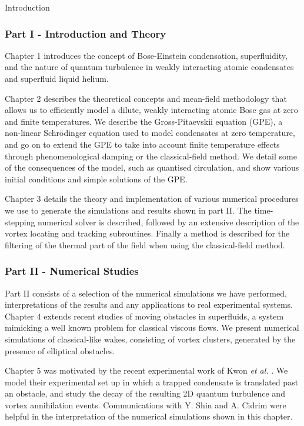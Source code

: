 \begin{chapter}{\label{cha:bose_gases}Introduction}
\subsubsection{Part I - Introduction and Theory}
Chapter 1 introduces the concept of Bose-Einstein condensation, superfluidity, and the nature of quantum turbulence in weakly interacting atomic condensates and superfluid liquid helium.

Chapter 2 describes the theoretical concepts and mean-field methodology that allows us to efficiently model a dilute, weakly interacting atomic Bose gas at zero and finite temperatures. We describe the Gross-Pitaevskii equation (GPE), a non-linear Schr\"odinger equation used to model condensates at zero temperature, and go on to extend the GPE to take into account finite temperature effects through phenomenological damping or the classical-field method. We detail some of the consequences of the model, such as quantised circulation, and show various initial conditions and simple solutions of the GPE.

Chapter 3 details the theory and implementation of various numerical procedures we use to generate the simulations and results shown in part II. The time-stepping numerical solver is described, followed by an extensive description of the vortex locating and tracking subroutines. Finally a method is described for the filtering of the thermal part of the field when using the classical-field method.

\subsubsection{Part II - Numerical Studies}
Part II consists of a selection of the numerical simulations we have performed, interpretations of the results and any applications to real experimental systems. Chapter 4 extends recent studies of moving obstacles in superfluids, a system mimicking a well known problem for classical viscous flows. We present numerical simulations of classical-like wakes, consisting of vortex clusters, generated by the presence of elliptical obstacles.

Chapter 5 was motivated by the recent experimental work of Kwon {\it et al.} \cite{kwon_moon_14}. We model their experimental set up in which a trapped condensate is translated past an obstacle, and study the decay of the resulting 2D quantum turbulence and vortex annihilation events. Communications with Y. Shin and A. Cidrim were helpful in the interpretation of the numerical simulations shown in this chapter.


\end{chapter}
